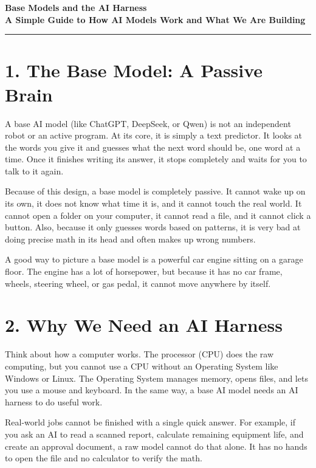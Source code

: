 \documentclass[11pt,a4paper]{article}
\begin{document}
\begin{center}
  {\Large \textbf{Base Models and the AI Harness}}\\[4pt]
  {\large \textbf{A Simple Guide to How AI Models Work and What We Are Building}}
\end{center}

\vspace{0.2cm}
\hrule
\vspace{0.3cm}

\section*{1. The Base Model: A Passive Brain}

A base AI model (like ChatGPT, DeepSeek, or Qwen) is not an independent robot or an active program. At its core, it is simply a text predictor. It looks at the words you give it and guesses what the next word should be, one word at a time. Once it finishes writing its answer, it stops completely and waits for you to talk to it again.

Because of this design, a base model is completely passive. It cannot wake up on its own, it does not know what time it is, and it cannot touch the real world. It cannot open a folder on your computer, it cannot read a file, and it cannot click a button. Also, because it only guesses words based on patterns, it is very bad at doing precise math in its head and often makes up wrong numbers.

A good way to picture a base model is a powerful car engine sitting on a garage floor. The engine has a lot of horsepower, but because it has no car frame, wheels, steering wheel, or gas pedal, it cannot move anywhere by itself.

\section*{2. Why We Need an AI Harness}

Think about how a computer works. The processor (CPU) does the raw computing, but you cannot use a CPU without an Operating System like Windows or Linux. The Operating System manages memory, opens files, and lets you use a mouse and keyboard. In the same way, a base AI model needs an AI harness to do useful work.

Real-world jobs cannot be finished with a single quick answer. For example, if you ask an AI to read a scanned report, calculate remaining equipment life, and create an approval document, a raw model cannot do that alone. It has no hands to open the file and no calculator to verify the math.
\end{document}
